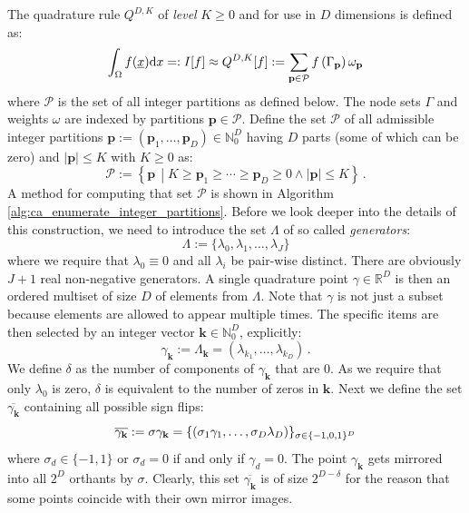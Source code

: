 \documentclass[a4paper,10pt]{article}
\begin{document}
The quadrature rule $Q^{D,K}$ of \emph{level} $K \geq 0$ and
for use in $D$ dimensions is defined as:
\begin{equation} \label{eq:gk_basic_formula}
  \int_\Omega f(\underline{x}) \mathrm{d}x =:
  I[f] \approx Q^{D,K}[f]
       := \sum_{\mathbf{p} \in \mathcal{P}}
            f\left(\Gamma_{\mathbf{p}}\right)
            \omega_{\mathbf{p}}
\end{equation}
where $\mathcal{P}$ is the set of all integer partitions as defined below.
The node sets $\Gamma$ and weights $\omega$ are indexed by partitions
$\mathbf{p} \in \mathcal{P}$.
Define the set $\mathcal{P}$ of all admissible integer partitions
$\mathbf{p} := (\mathbf{p}_{1}, \ldots, \mathbf{p}_{D}) \in \mathbb{N}_{0}^{D}$
having $D$ parts (some of which can be zero) and $|\mathbf{p}| \leq K$
with $K \geq 0$ as:
\begin{equation} \label{eq:partition_set_def}
  \mathcal{P} :=
  \left\{
    \mathbf{p} \,
    \middle| K \geq \mathbf{p}_{1} \geq \cdots \geq \mathbf{p}_{D} \geq 0
    \wedge
    |\mathbf{p}| \leq K
  \right\}
  \,.
\end{equation}
A method for computing that set $\mathcal{P}$
is shown in Algorithm \ref{alg:ca_enumerate_integer_partitions}.
Before we look deeper into the details of this construction,
we need to introduce the set $\Lambda$ of so called \emph{generators}:
\begin{equation}
  \Lambda := \{\lambda_{0}, \lambda_{1}, \ldots, \lambda_{J}\}
\end{equation}
where we require that $\lambda_{0} \equiv 0$ and all $\lambda_{i}$ be
pair-wise distinct. There are obviously $J+1$ real non-negative generators.
A single quadrature point $\gamma \in \mathbb{R}^D$ is then an ordered
multiset of size $D$ of elements from $\Lambda$. Note that $\gamma$ is not
just a subset because elements are allowed to appear multiple times. The
specific items are then selected by an integer vector $\mathbf{k} \in \mathbb{N}_0^D$,
explicitly:
\begin{equation}
  \gamma_\mathbf{k} := \Lambda_\mathbf{k} = \left(\lambda_{k_1}, \ldots, \lambda_{k_D}\right) \,.
\end{equation}
We define $\delta$ as the number of components of $\gamma_\mathbf{k}$ that are 0.
As we require that only $\lambda_0$ is zero, $\delta$ is equivalent to the number
of zeros in $\mathbf{k}$.
Next we define the set $\overline{\gamma_\mathbf{k}}$ containing all
possible sign flips:
\begin{equation}
  \overline{\gamma_\mathbf{k}} :=
  \sigma \gamma_\mathbf{k} =
  \{
  \left(\sigma_1 \gamma_1, \ldots, \sigma_D \lambda_D\right)
  \}_{\sigma \in \{-1,0,1\}^D}
\end{equation}
where $\sigma_d \in \{-1, 1\}$ or $\sigma_d = 0$ if and only if $\gamma_d = 0$.
The point $\gamma_\mathbf{k}$ gets mirrored into all $2^D$ orthants by $\sigma$.
Clearly, this set $\overline{\gamma_\mathbf{k}}$ is of size $2^{D-\delta}$ for
the reason that some points coincide with their own mirror images.
\end{document}
